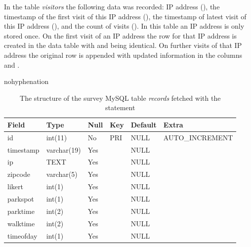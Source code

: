 In the table \textit{visitors} the following data was recorded: IP address (), the timestamp of the first visit of this IP address (), the timestamp of latest visit of this IP address (), and the count of visits (). In this table an IP address is only stored once. On the first visit of an IP address the row for that IP address is created in the data table with  and  being identical. On further visits of that IP address the original row is appended with updated information in the columns  and .

\begin{hyphenrules}{nohyphenation}
    \begin{table}[H]
        \centering
        \setlength\tabcolsep{1.2ex}
        \caption[Structure of MySQL table records]{The structure of the survey MySQL table \textit{records} fetched with the statement } 
        \label{tab:mysql_records_str}
        \begin{tabular}{ @{} >{\raggedright\arraybackslash}p{2cm} >{\raggedright\arraybackslash}p{2cm} >{\raggedright\arraybackslash}p{1cm} >{\raggedright\arraybackslash}p{1cm} >{\raggedright\arraybackslash}p{1.5cm} >{\raggedleft\arraybackslash}p{4cm} @{} }
            \toprule
            Field & Type & Null & Key & Default & Extra \\
            \midrule
            id & int(11) & No & PRI & NULL & AUTO\_INCREMENT \\
            timestamp & varchar(19) & Yes & & NULL & \\
            ip & TEXT & Yes & & NULL & \\
            zipcode & varchar(5) & Yes & & NULL & \\
            likert & int(1) & Yes & & NULL & \\
            parkspot & int(1) & Yes & & NULL & \\
            parktime & int(2) & Yes & & NULL & \\
            walktime & int(2) & Yes & & NULL & \\
            timeofday & int(1) & Yes & & NULL & \\
            \bottomrule
        \end{tabular}
    \end{table} 
\end{hyphenrules}

